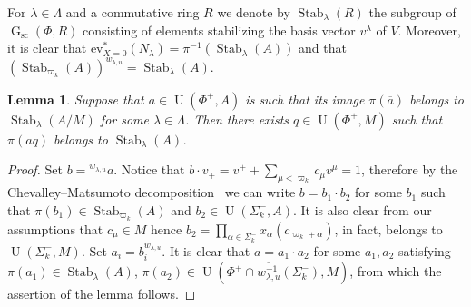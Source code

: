 \documentclass[oneside, 10pt]{amsart}
\DeclareMathOperator{\St}{St}
\DeclareMathOperator{\G}{G}
\DeclareMathOperator{\UU}{U}
\newcommand{\Gsc}{\G_\mathrm{sc}}
\DeclareMathOperator{\Stab}{Stab}
\numberwithin{equation}{section}
\numberwithin{thm}{section}
\newtheorem{lemma}[thm]{Lemma}
\numberwithin{lemma}{section}
\theoremstyle{definition}
\theoremstyle{remark}
\begin{document}
For $\lambda \in \Lambda$ and a commutative ring $R$ we denote by $\Stab_{\lambda}(R)$ the subgroup of $\Gsc(\Phi, R)$
consisting of elements stabilizing the basis vector $v^\lambda$ of $V$.
Moreover, it is clear that $\mathrm{ev}_{X=0}^*(N_\lambda) = \pi^{-1}(\Stab_\lambda(A))$ and that
$(\Stab_{\varpi_k}(A))^{w_{\lambda, u}} = \Stab_\lambda(A)$.
\begin{lemma} \label{lem:q}
Suppose that $a \in \UU(\Phi^+, A)$ is such that its image $\pi(\overline{a})$ belongs to $\Stab_{\lambda}(A/M)$ for some $\lambda \in \Lambda$.
Then there exists $q \in \UU(\Phi^+, M)$ such that $\pi(aq)$ belongs to $\Stab_{\lambda}(A)$.
\end{lemma}
\begin{proof}
Set $b = {}^{w_{\lambda, u}} a$.
Notice that $b \cdot v_+ = v^+ + \sum_{\mu < \varpi_k} c_\mu v^\mu = 1$, therefore by the Chevalley--Matsumoto decomposition~\cite[Theorem~1.3]{St78} we can write
$b = b_1 \cdot b_2$ for some $b_1$ such that $\pi(b_1) \in \Stab_{\varpi_k}(A)$ and $b_2 \in \UU(\Sigma_k^-, A)$.
It is also clear from our assumptions that $c_\mu \in M$ hence $b_2 = \prod_{\alpha \in \Sigma_k^-}x_{\alpha}(c_{\varpi_k + \alpha})$, in fact, belongs to $\UU(\Sigma_k^-, M)$.
Set $a_i = b_i^{w_{\lambda, u}}$.
It is clear that $a = a_1 \cdot a_2$  for some $a_1, a_2$ satisfying $\pi(a_1) \in \Stab_\lambda(A)$, $\pi(a_2) \in \UU(\Phi^+ \cap \overline{w_{\lambda, u}^{-1}}(\Sigma_k^-), M)$,
from which the assertion of the lemma follows.
\end{proof}
\end{document}
